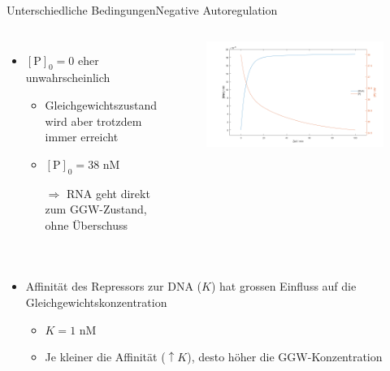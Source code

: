\documentclass[11pt,aspectratio=169,reqno]{beamer}
\begin{document}
\begin{frame}{Unterschiedliche Bedingungen\hfill {\small Negative Autoregulation}}
    \begin{columns}
        \begin{itemize}
            \item $[\text{P}]_0=0$ eher unwahrscheinlich
            \begin{itemize}
                \item Gleichgewichtszustand wird aber trotzdem immer erreicht
                \item $[\text{P}]_0=38\text{ nM}$
                \item[$\Rightarrow$] RNA geht direkt zum GGW-Zustand, ohne Überschuss
            \end{itemize}
        \end{itemize}
        
        \begin{figure}
            \centering
            \includegraphics[width=\linewidth]{images/simulations/negative_autoregulation_high_protein.m.png}
        \end{figure}
    \end{columns}
    \pause

    \begin{columns}
        \begin{itemize}
            \item Affinität des Repressors zur DNA ($K$) hat grossen Einfluss auf die Gleichgewichtskonzentration
            \begin{itemize}
                \item $K=1\text{ nM}$
                \item Je kleiner die Affinität ($\uparrow K$), desto höher die GGW-Konzentration
            \end{itemize}
        \end{itemize}


\end{columns}
\end{frame}
\end{document}
